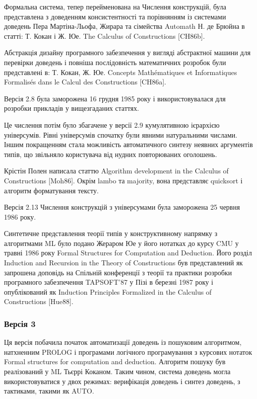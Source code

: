 \documentclass{article}
\begin{document}
Формальна система, тепер перейменована на Числення конструкцій, була представлена з доведенням консистентності та порівнянням із системами доведень Пера Мартіна-Льофа, Жирара та сімейства Automath Н. де Брюйна в статті: Т. Кокан і Ж. Юе. The Calculus of Constructions [CH86b].

Абстракція дизайну програмного забезпечення у вигляді абстрактної машини для перевірки доведень і повніша послідовність математичних розробок були представлені в: Т. Кокан, Ж. Юе. Concepts Mathématiques et Informatiques Formalisés dans le Calcul des Constructions [CH86a].

Версія 2.8 була заморожена 16 грудня 1985 року і використовувалася для розробки прикладів у вищезгаданих статтях.

Це числення потім було збагачене у версії 2.9 кумулятивною ієрархією універсумів. Рівні універсумів спочатку були явними натуральними числами. Іншим покращенням стала можливість автоматичного синтезу неявних аргументів типів, що звільняло користувача від нудних повторюваних оголошень.

Крістін Полен написала статтю Algorithm development in the Calculus of Constructions [Moh86]. Окрім lambo та majority, вона представляє quicksort і алгоритм форматування тексту.

Версія 2.13 Числення конструкцій з універсумами була заморожена 25 червня 1986 року.

Синтетичне представлення теорії типів у конструктивному напрямку з алгоритмами ML було подано Жераром Юе у його нотатках до курсу CMU у травні 1986 року Formal Structures for Computation and Deduction. Його розділ Induction and Recursion in the Theory of Constructions був представлений як запрошена доповідь на Спільній конференції з теорії та практики розробки програмного забезпечення TAPSOFT’87 у Пізі в березні 1987 року і опублікований як Induction Principles Formalized in the Calculus of Constructions [Hue88].

\subsubsection{Версія 3}

Ця версія побачила початок автоматизації доведень із пошуковим алгоритмом, натхненним PROLOG і програмами логічного програмування з курсових нотаток Formal structures for computation and deduction. Алгоритм пошуку був реалізований у ML Тьєррі Коканом. Таким чином, система доведень могла використовуватися у двох режимах: верифікація доведень і синтез доведень, з тактиками, такими як AUTO.
\end{document}
